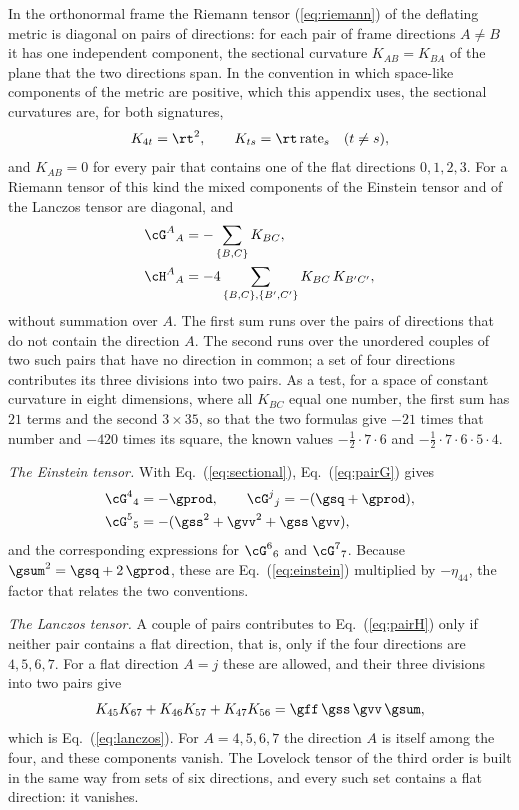 In the orthonormal frame the Riemann tensor (\ref{eq:riemann}) of the deflating metric is diagonal
on pairs of directions: for each pair of frame directions $A\ne B$ it has one independent component,
the sectional curvature $K_{AB}=K_{BA}$ of the plane that the two directions span. In the convention
in which space-like components of the metric are positive, which this appendix uses, the sectional
curvatures are, for both signatures,
\begin{equation}
K_{4t}=\rt^{2},\qquad K_{ts}=\rt\,\mathrm{rate}_s\quad(t\ne s),
\label{eq:sectional}
\end{equation}
and $K_{AB}=0$ for every pair that contains one of the flat directions $0,1,2,3$. For a
Riemann tensor of this kind the mixed components of the Einstein tensor and of the Lanczos tensor
are diagonal, and
\begin{align}
\cG^{A}{}_{A}&=-\sum_{\{B,C\}}K_{BC},\label{eq:pairG}\\
\cH^{A}{}_{A}&=-4\sum_{\{B,C\},\{B',C'\}}K_{BC}\,K_{B'C'},
\label{eq:pairH}
\end{align}
without summation over $A$. The first sum runs over the pairs of directions that do not contain the
direction $A$. The second runs over the unordered couples of two such pairs that have no direction
in common; a set of four directions contributes its three divisions into two pairs. As a test, for a
space of constant curvature in eight dimensions, where all $K_{BC}$ equal one number, the first sum
has $21$ terms and the second $3\times35$, so that the two formulas give $-21$ times that number and
$-420$ times its square, the known values $-\tfrac12\cdot7\cdot6$ and
$-\tfrac12\cdot7\cdot6\cdot5\cdot4$.

\emph{The Einstein tensor.} With Eq.~(\ref{eq:sectional}), Eq.~(\ref{eq:pairG}) gives
\begin{equation}
\begin{aligned}
\cG^{4}{}_{4}&=-\gprod,\qquad\cG^{j}{}_{j}=-(\gsq+\gprod),\\
\cG^{5}{}_{5}&=-(\gss^{2}+\gvv^{2}+\gss\,\gvv),
\end{aligned}
\end{equation}
and the corresponding expressions for $\cG^{6}{}_{6}$ and $\cG^{7}{}_{7}$. Because
$\gsum^{2}=\gsq+2\,\gprod$, these are Eq.~(\ref{eq:einstein}) multiplied by $-\eta_{44}$, the factor
that relates the two conventions.

\emph{The Lanczos tensor.} A couple of pairs contributes to Eq.~(\ref{eq:pairH}) only if neither
pair contains a flat direction, that is, only if the four directions are $4,5,6,7$. For a flat
direction $A=j$ these are allowed, and their three divisions into two pairs give
\begin{equation}
K_{45}K_{67}+K_{46}K_{57}+K_{47}K_{56}=\gff\,\gss\,\gvv\,\gsum ,
\end{equation}
which is Eq.~(\ref{eq:lanczos}). For $A=4,5,6,7$ the direction $A$ is itself among the four, and
these components vanish. The Lovelock tensor of the third order is built in the same way from sets
of six directions, and every such set contains a flat direction: it vanishes.

